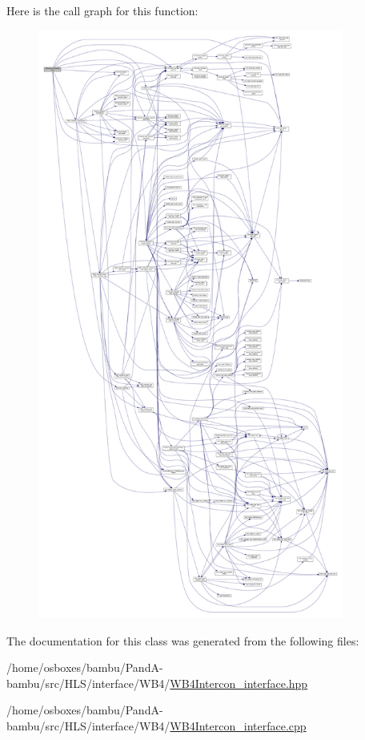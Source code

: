 Here is the call graph for this function\+:
\nopagebreak
\begin{figure}[H]
\begin{center}
\leavevmode
\includegraphics[height=550pt]{de/d3d/classWB4Intercon__interface_a3e1e0b77dcc355b24a19bfe32de05610_cgraph}
\end{center}
\end{figure}


The documentation for this class was generated from the following files\+:\begin{DoxyCompactItemize}
\item 
/home/osboxes/bambu/\+Pand\+A-\/bambu/src/\+H\+L\+S/interface/\+W\+B4/\hyperlink{WB4Intercon__interface_8hpp}{W\+B4\+Intercon\+\_\+interface.\+hpp}\item 
/home/osboxes/bambu/\+Pand\+A-\/bambu/src/\+H\+L\+S/interface/\+W\+B4/\hyperlink{WB4Intercon__interface_8cpp}{W\+B4\+Intercon\+\_\+interface.\+cpp}\end{DoxyCompactItemize}
